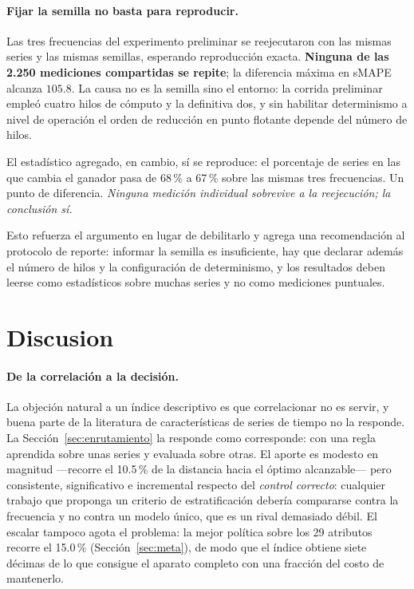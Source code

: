 \paragraph{Fijar la semilla no basta para reproducir.} Las tres frecuencias del
experimento preliminar se reejecutaron con las mismas series y las mismas semillas,
esperando reproducción exacta. \textbf{Ninguna de las 2.250 mediciones compartidas se
repite}; la diferencia máxima en sMAPE alcanza $105.8$. La causa no es la semilla sino
el entorno: la corrida preliminar empleó cuatro hilos de cómputo y la definitiva dos,
y sin habilitar determinismo a nivel de operación el orden de reducción en punto
flotante depende del número de hilos.

El estadístico agregado, en cambio, sí se reproduce: el porcentaje de series en las
que cambia el ganador pasa de 68\,\% a 67\,\% sobre las mismas tres frecuencias. Un
punto de diferencia. \emph{Ninguna medición individual sobrevive a la reejecución; la
conclusión sí.}

Esto refuerza el argumento en lugar de debilitarlo y agrega una recomendación al
protocolo de reporte: informar la semilla es insuficiente, hay que declarar además el
número de hilos y la configuración de determinismo, y los resultados deben leerse como
estadísticos sobre muchas series y no como mediciones puntuales.


\section{Discusion}\label{sec:discusion}

\paragraph{De la correlación a la decisión.} La objeción natural a un índice descriptivo
es que correlacionar no es servir, y buena parte de la literatura de características de
series de tiempo no la responde. La Sección~\ref{sec:enrutamiento} la responde como
corresponde: con una regla aprendida sobre unas series y evaluada sobre otras. El aporte
es modesto en magnitud ---recorre el 10.5\,\% de la distancia hacia el óptimo
alcanzable--- pero consistente, significativo e incremental respecto del \emph{control
correcto}: cualquier trabajo que proponga un criterio de estratificación debería
compararse contra la frecuencia y no contra un modelo único, que es un rival demasiado
débil. El escalar tampoco agota el problema: la mejor política sobre los 29 atributos
recorre el 15.0\,\% (Sección~\ref{sec:meta}), de modo que el índice obtiene siete décimas
de lo que consigue el aparato completo con una fracción del costo de mantenerlo.

